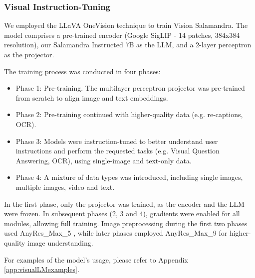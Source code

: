\subsubsection{Visual Instruction-Tuning}

We employed the LLaVA OneVision technique \cite{llavaonevision} to train Vision Salamandra. The model comprises a pre-trained encoder (Google SigLIP \cite{siglip} - 14 patches, 384x384 resolution), our Salamandra Instructed 7B as the LLM, and a 2-layer perceptron as the projector.

The training process was conducted in four phases:

\begin{itemize}
\item Phase 1: Pre-training. The multilayer perceptron projector was pre-trained from scratch to align image and text embeddings.
\item Phase 2: Pre-training continued with higher-quality data (e.g. re-captions, OCR).
\item Phase 3: Models were instruction-tuned to better understand user instructions and perform the requested tasks (e.g. Visual Question Answering, OCR), using single-image and text-only data.
\item Phase 4: A mixture of data types was introduced, including single images, multiple images, video and text.
\end{itemize}

In the first phase, only the projector was trained, as the encoder and the LLM were frozen. In subsequent phases (2, 3 and 4), gradients were enabled for all modules, allowing full training. Image preprocessing during the first two phases used AnyRes\_Max\_5 \cite{llavanext}, while later phases employed AnyRes\_Max\_9 for higher-quality image understanding.

For examples of the model's usage, please refer to Appendix \ref{app:visualLMexamples}.